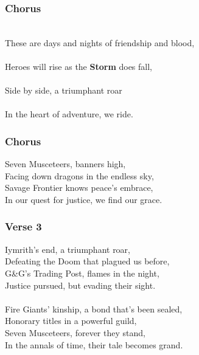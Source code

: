 \documentclass[letterpaper,openany,oneside,twocolumn]{book}
\begin{document}
\subsubsection*{Chorus}
\hspace*{1.5cm}\hspace*{0.9cm}\hspace*{1cm}\hspace*{1.8cm}\\
{\entryfont These are days and nights of friendship and blood,}\\
\hspace*{1.1cm}\hspace*{1.3cm}\hspace*{1.3cm}\\
{\entryfont Heroes will rise as the \textbf{Storm} does fall,}\\
\hspace*{0.85cm}\hspace*{0.4cm}\hspace*{1.3cm}\\
{\entryfont Side by side, a triumphant roar}\\
\hspace*{1.1cm}\hspace*{0.4cm}\hspace*{1.9cm}\\
{\entryfont In the heart of adventure, we ride.}
\vfill\eject

\subsubsection*{Chorus}
{\entryfont Seven Musceteers, banners high,}\\
Facing down dragons in the endless sky,\\
Savage Frontier knows peace's embrace,\\
In our quest for justice, we find our grace.

\subsubsection*{Verse 3}
\entryfont Iymrith's end, a triumphant roar,\\
Defeating the Doom that plagued us before,\\
G\&G's Trading Post, flames in the night,\\
Justice pursued, but evading their sight.\\\\
Fire Giants' kinship, a bond that's been sealed,\\
Honorary titles in a powerful guild,\\
Seven Musceteers, forever they stand,\\
In the annals of time, their tale becomes grand.
\end{document}
